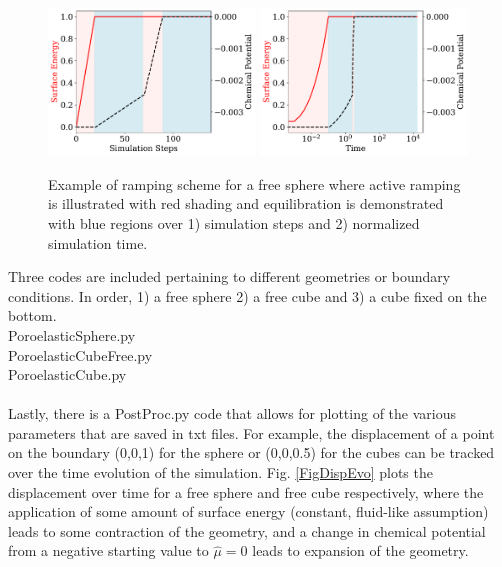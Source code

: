 \documentclass[12pt,3p]{article}
\numberwithin{equation}{section}
\begin{document}
\begin{figure}[!htb]
\centering
\includegraphics[width=0.49\textwidth]{./Images/SphereSimSteps}
\includegraphics[width=0.49\textwidth]{./Images/SphereSimTime}
\caption{Example of ramping scheme for a free sphere where active ramping is illustrated with red shading and equilibration is demonstrated with blue regions over 1) simulation steps and 2) normalized simulation time. }
\label{FigRampingRegime}
\end{figure}

Three codes are included pertaining to different geometries or boundary conditions. In order, 1) a free sphere 2) a free cube and 3) a cube fixed on the bottom. \\
{\selectfont 
PoroelasticSphere.py \\
PoroelasticCubeFree.py \\
PoroelasticCube.py \\ \\ 
}
Lastly, there is a {\selectfont PostProc.py} code that allows for plotting of the various parameters that are saved in txt files. For example, the displacement of a point on the boundary (0,0,1) for the sphere or (0,0,0.5) for the cubes can be tracked over the time evolution of the simulation. Fig. \ref{FigDispEvo} plots the displacement over time for a free sphere and free cube respectively, where the application of some amount of surface energy (constant, fluid-like assumption) leads to some contraction of the geometry, and a change in chemical potential from a negative starting value to $\hat{\mu} = 0$ leads to expansion of the geometry. 
\end{document}
